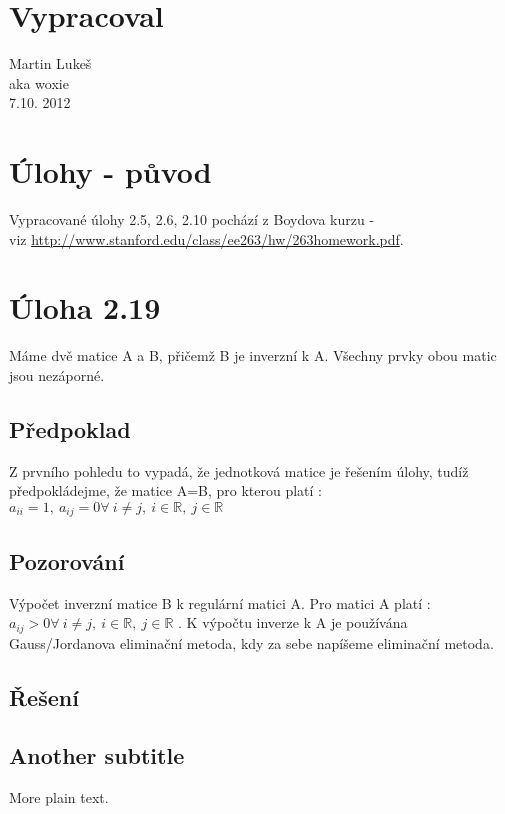 \documentclass{article}
\begin{document}
\section{Vypracoval}
Martin Lukeš \\
aka woxie\\
7.10. 2012


\section{Úlohy - původ}
Vypracované úlohy 2.5, 2.6, 2.10 pochází z Boydova kurzu - \\ viz
\hyperref[Boydova
kurzu]{http://www.stanford.edu/class/ee263/hw/263homework.pdf}.

\section{Úloha 2.19}
Máme dvě matice A a B, přičemž B je inverzní k A. Všechny prvky obou matic jsou
nezáporné.
\subsection{Předpoklad}
Z prvního pohledu to vypadá, že jednotková matice je řešením úlohy, tudíž
předpokládejme, že matice A=B, pro kterou platí : $a_{ii} = 1,\ a_{ij} = 0
\forall\ i \neq j ,\ i \in \mathbb{R},\ j \in \mathbb{R} $
\subsection{Pozorování} Výpočet inverzní matice B k regulární matici A. Pro
matici A platí :
$a_{ij} > 0 \forall\ i \neq j ,\ i \in \mathbb{R},\ j \in \mathbb{R} $ . K
výpočtu inverze k A je používána Gauss/Jordanova eliminační metoda, kdy za sebe
napíšeme eliminační metoda.

\subsection{Řešení}


\subsection{Another subtitle}

More plain text.
\end{document}
